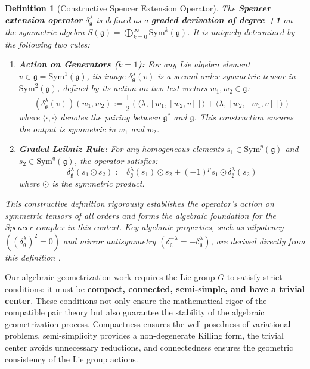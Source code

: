 \documentclass[a4paper,12pt]{extarticle}
\newtheorem{definition}{Definition}
\theoremstyle{definition}
\begin{document}
\begin{definition}[Constructive Spencer Extension Operator]
\label{def:constructive_spencer_operator}
The \textbf{Spencer extension operator} $\delta^{\lambda}_{\mathfrak{g}}$ is defined as a \textbf{graded derivation of degree +1} on the symmetric algebra $S(\mathfrak{g}) = \bigoplus_{k=0}^{\infty} \mathrm{Sym}^k(\mathfrak{g})$. It is uniquely determined by the following two rules:
\begin{enumerate}
    \item[\textbf{(A)}] \textbf{Action on Generators ($k=1$):} For any Lie algebra element $v \in \mathfrak{g} = \mathrm{Sym}^1(\mathfrak{g})$, its image $\delta^{\lambda}_{\mathfrak{g}}(v)$ is a second-order symmetric tensor in $\mathrm{Sym}^2(\mathfrak{g})$, defined by its action on two test vectors $w_1, w_2 \in \mathfrak{g}$:
    \begin{equation}
        (\delta^{\lambda}_{\mathfrak{g}}(v))(w_1, w_2) := \frac{1}{2} \left( \langle\lambda, [w_1, [w_2, v]]\rangle + \langle\lambda, [w_2, [w_1, v]]\rangle \right)
    \end{equation}
    where $\langle \cdot, \cdot \rangle$ denotes the pairing between $\mathfrak{g}^*$ and $\mathfrak{g}$. This construction ensures the output is symmetric in $w_1$ and $w_2$.

    \item[\textbf{(B)}] \textbf{Graded Leibniz Rule:} For any homogeneous elements $s_1 \in \mathrm{Sym}^p(\mathfrak{g})$ and $s_2 \in \mathrm{Sym}^q(\mathfrak{g})$, the operator satisfies:
    \begin{equation}
        \delta^{\lambda}_{\mathfrak{g}}(s_1 \odot s_2) := \delta^{\lambda}_{\mathfrak{g}}(s_1) \odot s_2 + (-1)^p s_1 \odot \delta^{\lambda}_{\mathfrak{g}}(s_2)
    \end{equation}
    where $\odot$ is the symmetric product.
\end{enumerate}
This constructive definition rigorously establishes the operator's action on symmetric tensors of all orders and forms the algebraic foundation for the Spencer complex in this context. Key algebraic properties, such as nilpotency $((\delta^{\lambda}_{\mathfrak{g}})^2 = 0)$ and mirror antisymmetry $(\delta^{-\lambda}_{\mathfrak{g}} = -\delta^{\lambda}_{\mathfrak{g}})$, are derived directly from this definition \cite{zheng2025geometric, zheng2025constructing}.
\end{definition}

Our algebraic geometrization work requires the Lie group $G$ to satisfy strict conditions: it must be \textbf{compact, connected, semi-simple, and have a trivial center}. These conditions not only ensure the mathematical rigor of the compatible pair theory but also guarantee the stability of the algebraic geometrization process. Compactness ensures the well-posedness of variational problems, semi-simplicity provides a non-degenerate Killing form, the trivial center avoids unnecessary reductions, and connectedness ensures the geometric consistency of the Lie group actions.
\end{document}
